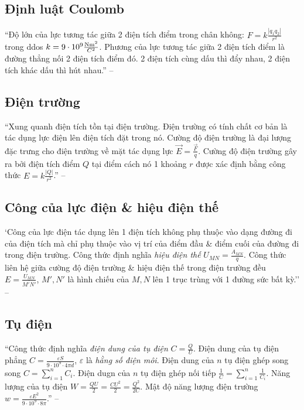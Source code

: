 \documentclass[oneside]{book}
\numberwithin{equation}{section}
\begin{document}
\subsection{Định luật Coulomb}
``Độ lớn của lực tương tác giữa 2 điện tích điểm trong chân không: $F = k\frac{|q_1q_2|}{r^2}$ trong ddos $k = 9\cdot 10^9\frac{\rm Nm^2}{C^2}$. Phương của lực tương tác giữa 2 điện tích điểm là đường thẳng nối 2 điện tích điểm đó. 2 điện tích cùng dấu thì đẩy nhau, 2 điện tích khác dấu thì hút nhau.'' -- \cite[p. 45]{SGK_Vat_Ly_11_nang_cao}

\subsection{Điện trường}
``Xung quanh điện tích tồn tại điện trường. Điện trường có tính chất cơ bản là tác dụng lực điện lên điện tích đặt trong nó. Cường độ điện trường là đại lượng đặc trưng cho điện trường về mặt tác dụng lực $\overrightarrow{E} = \frac{\overrightarrow{F}}{q}$. Cường độ điện trường gây ra bởi điện tích điểm $Q$ tại điểm cách nó 1 khoảng $r$ được xác định bằng công thức $E = k\frac{|Q|}{r^2}$.'' -- \cite[p. 45]{SGK_Vat_Ly_11_nang_cao}

\subsection{Công của lực điện \& hiệu điện thế}
`Công của lực điện tác dụng lên 1 điện tích không phụ thuộc vào dạng đường đi của điện tích mà chỉ phụ thuộc vào vị trí của điểm đầu \& điểm cuối của đường đi trong điện trường. Công thức định nghĩa \textit{hiệu điện thế} $U_{MN} = \frac{A_{MN}}{q}$. Công thức liên hệ giữa cường độ điện trường \& hiệu điện thế trong điện trường đều $E = \frac{U_{MN}}{\overline{M'N'}}$, $M',N'$ là hình chiếu của $M,N$ lên 1 trục trùng với 1 đường sức bất kỳ.'' -- \cite[p. 45]{SGK_Vat_Ly_11_nang_cao}

\subsection{Tụ điện}
``Công thức định nghĩa \textit{điện dung của tụ điện} $C = \frac{Q}{U}$. Điện dung của tụ điện phẳng $C = \frac{\varepsilon S}{9\cdot 10^9\cdot 4\pi d}$, $\varepsilon$ là \textit{hằng số điện môi}. Điện dung của $n$ tụ điện ghép song song $C = \sum_{i=1}^n C_i$. Điện dugn của $n$ tụ điện ghép nối tiếp $\frac{1}{C} = \sum_{i=1}^n \frac{1}{C_i}$. Năng lượng của tụ điện $W = \frac{QU}{2} = \frac{CU^2}{2} = \frac{Q^2}{2C}$. Mật độ năng lượng điện trường $w = \frac{\varepsilon E^2}{9\cdot 10^9\cdot 8\pi}$.'' -- \cite[p. 45]{SGK_Vat_Ly_11_nang_cao}
\end{document}
